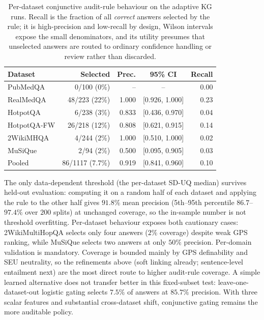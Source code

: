 \begin{table}[t]
\centering
\scriptsize
\caption{%
  Per-dataset conjunctive audit-rule behaviour on the adaptive KG runs.
  Recall is the fraction of all \emph{correct} answers selected by the rule;
  it is high-precision and low-recall by design,
  Wilson intervals expose the small denominators,
  and its utility presumes that unselected answers are routed to ordinary
  confidence handling or review rather than discarded.%
}
\label{tab:certificate_perds}
\setlength{\tabcolsep}{2.5pt}
\begin{tabular}{@{}lrrcr@{}}
\toprule
Dataset & Selected & Prec. & 95\% CI & Recall \\
\midrule
PubMedQA & 0/100 (0\%) & -- & -- & 0.00 \\
RealMedQA & 48/223 (22\%) & 1.000 & [0.926, 1.000] & 0.23 \\
HotpotQA & 6/238 (3\%) & 0.833 & [0.436, 0.970] & 0.04 \\
HotpotQA-FW & 26/218 (12\%) & 0.808 & [0.621, 0.915] & 0.14 \\
2WikiMHQA & 4/244 (2\%) & 1.000 & [0.510, 1.000] & 0.02 \\
MuSiQue & 2/94 (2\%) & 0.500 & [0.095, 0.905] & 0.03 \\
\midrule
Pooled & 86/1117 (7.7\%) & 0.919 & [0.841, 0.960] & 0.10 \\
\bottomrule
\end{tabular}
\end{table}
The only data-dependent threshold (the per-dataset SD-UQ median)
survives held-out evaluation: computing it on a random half of each dataset
and applying the rule to the other half gives $91.8\%$ mean precision
(5th--95th percentile $86.7$--$97.4\%$ over $200$ splits) at unchanged
coverage, so the in-sample number is not threshold overfitting.
Per-dataset behaviour exposes both cautionary cases: 2WikiMultiHopQA
selects only four answers ($2\%$ coverage) despite weak GPS ranking, while
MuSiQue selects two answers at only $50\%$ precision.
Per-domain validation is mandatory.
Coverage is bounded mainly by GPS definability and SEU neutrality, so
the refinements above (soft linking already; sentence-level entailment next)
are the most direct route to higher audit-rule coverage.
A simple learned alternative does not transfer better in this fixed-subset test:
leave-one-dataset-out logistic gating selects $7.5\%$ of answers at $85.7\%$
precision. With three scalar features and substantial cross-dataset shift,
conjunctive gating remains the more auditable policy.
